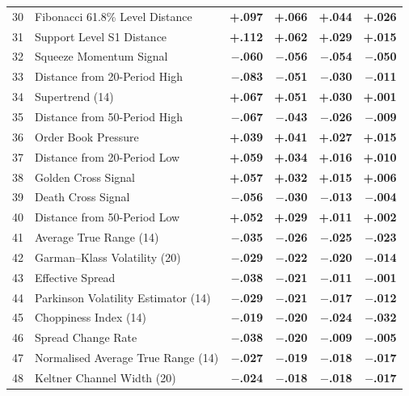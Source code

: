 \documentclass[12pt,a4paper]{article}
\theoremstyle{definition}
\theoremstyle{remark}
\newcommand{\pos}[1]{\textcolor{green1}{\textbf{+#1}}}
\newcommand{\negval}[1]{\textcolor{accent}{\textbf{$-$#1}}}
\begin{document}
\begin{longtable}{c>{\RaggedRight\arraybackslash}p{6.5cm}rrrr}
30 & Fibonacci 61.8\% Level Distance     & \pos{.097} & \pos{.066} & \pos{.044} & \pos{.026} \\
31 & Support Level S1 Distance           & \pos{.112} & \pos{.062} & \pos{.029} & \pos{.015} \\
32 & Squeeze Momentum Signal    & \negval{.060} & \negval{.056} & \negval{.054} & \negval{.050} \\
33 & Distance from 20-Period High     & \negval{.083} & \negval{.051} & \negval{.030} & \negval{.011} \\
34 & Supertrend (14)     & \pos{.067} & \pos{.051} & \pos{.030} & \pos{.001} \\
35 & Distance from 50-Period High     & \negval{.067} & \negval{.043} & \negval{.026} & \negval{.009} \\
36 & Order Book Pressure     & \pos{.039} & \pos{.041} & \pos{.027} & \pos{.015} \\
37 & Distance from 20-Period Low      & \pos{.059} & \pos{.034} & \pos{.016} & \pos{.010} \\
38 & Golden Cross Signal      & \pos{.057} & \pos{.032} & \pos{.015} & \pos{.006} \\
39 & Death Cross Signal       & \negval{.056} & \negval{.030} & \negval{.013} & \negval{.004} \\
40 & Distance from 50-Period Low      & \pos{.052} & \pos{.029} & \pos{.011} & \pos{.002} \\
41 & Average True Range (14)            & \negval{.035} & \negval{.026} & \negval{.025} & \negval{.023} \\
42 & Garman--Klass Volatility (20)  & \negval{.029} & \negval{.022} & \negval{.020} & \negval{.014} \\
43 & Effective Spread  & \negval{.038} & \negval{.021} & \negval{.011} & \negval{.001} \\
44 & Parkinson Volatility Estimator (14) & \negval{.029} & \negval{.021} & \negval{.017} & \negval{.012} \\
45 & Choppiness Index (14)     & \negval{.019} & \negval{.020} & \negval{.024} & \negval{.032} \\
46 & Spread Change Rate     & \negval{.038} & \negval{.020} & \negval{.009} & \negval{.005} \\
47 & Normalised Average True Range (14)           & \negval{.027} & \negval{.019} & \negval{.018} & \negval{.017} \\
48 & Keltner Channel Width (20) & \negval{.024} & \negval{.018} & \negval{.018} & \negval{.017} \\

\end{longtable}
\end{document}
